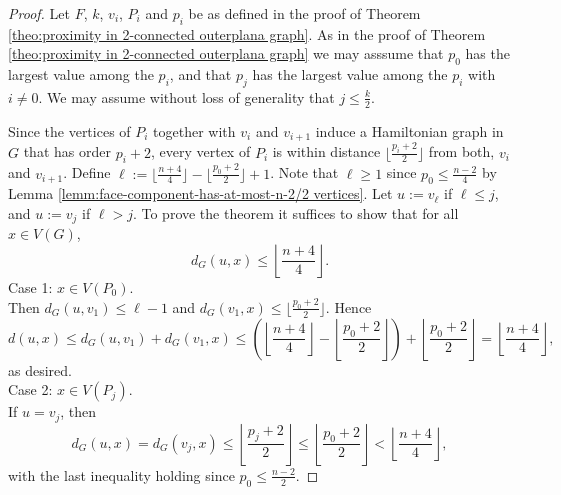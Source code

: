\documentclass[10pt,a4paper]{amsart}
\begin{document}
\begin{proof}              
Let $F$, $k$, $v_i$, $P_i$ and $p_i$ be as defined in the proof of 
Theorem \ref{theo:proximity in 2-connected outerplana graph}.
As in the proof of Theorem \ref{theo:proximity in 2-connected outerplana graph} we may asssume 
that $p_0$ has the largest value 
among the $p_i$, and that $p_j$ has the largest value among the $p_i$ with $i \neq 0$. 
We may assume without loss of generality that $j \leq \frac{k}{2}$.

Since the vertices of $P_i$ together with $v_i$ and $v_{i+1}$ induce a Hamiltonian graph in 
$G$ that has order $p_i+2$,  every vertex of $P_i$ is within distance 
$\lfloor \frac{p_i+2}{2} \rfloor$ from both, $v_i$ and $v_{i+1}$. Define 
$ \ell := \lfloor \frac{n+4}{4} \rfloor - \lfloor \frac{p_0+2}{2} \rfloor+ 1$. 
Note that $\ell \geq 1$ since $p_0 \leq \frac{n-2}{4}$ by 
Lemma \ref{lemm:face-component-has-at-most-n-2/2 vertices}.
Let $u:=v_{\ell}$ if $\ell \leq j$, and $u:=v_j$ if $\ell >j$.
To prove the theorem it suffices to show that for all $x \in V(G)$, 
\begin{equation}
d_G(u, x) \leq \left\lfloor \frac{n+4}{4} \right\rfloor.
\end{equation}  
{\sc Case 1:} $x \in V(P_0)$. \\
Then $d_G(u,v_1) \leq \ell-1$ and $d_G(v_1,x) \leq \lfloor \frac{p_0+2}{2} \rfloor$. Hence
\[ d(u,x) \leq d_G(u,v_1) + d_G(v_1, x) 
\leq \left(\left\lfloor \frac{n+4}{4} \right\rfloor - \left\lfloor \frac{p_0+2}{2} \right\rfloor \right) + \left\lfloor \frac{p_0+2}{2} \right\rfloor
= \left\lfloor \frac{n+4}{4} \right\rfloor, \]
as desired.\\[1mm]
{\sc Case 2:}  $x \in V(P_j)$. \\
If $u=v_j$, then 
\[ d_G(u,x) = d_G(v_j,x) \leq \left\lfloor \frac{p_j+2}{2} \right\rfloor 
   \leq  \left\lfloor \frac{p_0+2}{2} \right\rfloor
   <  \left\lfloor \frac{n+4}{4} \right\rfloor, \]
with the last inequality holding since $p_0 \leq \frac{n-2}{2}$. 


\end{proof}
\end{document}
